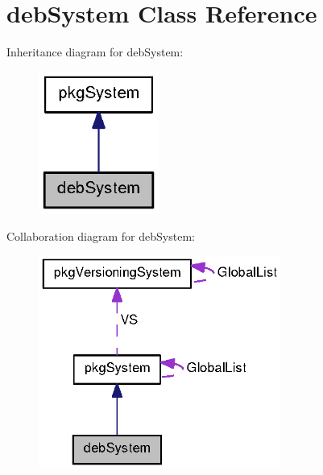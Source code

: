 \section{deb\-System \-Class \-Reference}
\label{classdebSystem}


\-Inheritance diagram for deb\-System\-:
\nopagebreak
\begin{figure}[H]
\begin{center}
\leavevmode
\includegraphics[width=112pt]{classdebSystem__inherit__graph}
\end{center}
\end{figure}


\-Collaboration diagram for deb\-System\-:
\nopagebreak
\begin{figure}[H]
\begin{center}
\leavevmode
\includegraphics[width=225pt]{classdebSystem__coll__graph}
\end{center}
\end{figure}
